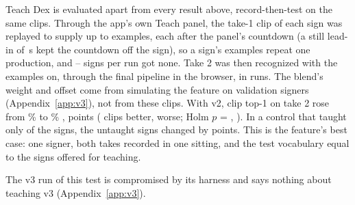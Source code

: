 Teach Dex is evaluated apart from every result above, record-then-test on the same clips. Through
the app's own Teach panel, the take-1 clip of each sign was replayed to supply up to
 examples, each after the panel's countdown (a still lead-in of \,s
kept the countdown off the sign), so a sign's examples repeat one production, and
-- signs per run got none. Take 2 was then recognized with the
examples on, through the final pipeline in the browser, in  runs. The blend's weight
and offset come from simulating the feature on validation signers (Appendix~\ref{app:v3}), not from
these clips. With v2, clip top-1 on take 2 rose from \%  to
\% ,  points  ( clips
better,  worse; Holm $p$ = , ). In a control that taught
only  of the signs, the untaught signs changed by  points. This is the
feature's best case: one signer, both takes recorded in one sitting, and the test vocabulary equal
to the signs offered for teaching.

The v3 run of this test is compromised by its harness and says nothing about teaching v3
(Appendix~\ref{app:v3}).
